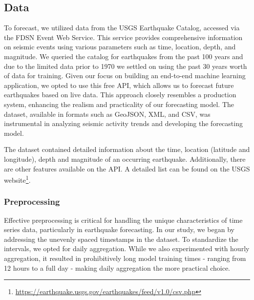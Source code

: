 \subsection{Data}
To forecast, we utilized data from the \ac{USGS} Earthquake Catalog, accessed via the \ac{FDSN} Event Web Service. This service provides comprehensive information on seismic events using various parameters such as time, location, depth, and magnitude. We queried the catalog for earthquakes from the past 100 years and due to the limited data prior to 1970 we settled on using the past 30 years worth of data for training. Given our focus on building an end-to-end machine learning application, we opted to use this free API, which allows us to forecast future earthquakes based on live data. This approach closely resembles a production system, enhancing the realism and practicality of our forecasting model. The dataset, available in formats such as GeoJSON, XML, and CSV, was instrumental in analyzing seismic activity trends and developing the forecasting model.

The dataset contained detailed information about the time, location (latitude and longitude), depth and magnitude of an occurring earthquake. Additionally, there are other features available on the API. A detailed list can be found on the \ac{USGS} website\footnote{\url{https://earthquake.usgs.gov/earthquakes/feed/v1.0/csv.php}}.



\subsubsection{Preprocessing}

Effective preprocessing is critical for handling the unique characteristics of time series data, particularly in earthquake forecasting. In our study, we began by addressing the unevenly spaced timestamps in the dataset. To standardize the intervals, we opted for daily aggregation. While we also experimented with hourly aggregation, it resulted in prohibitively long model training times - ranging from 12 hours to a full day - making daily aggregation the more practical choice.

